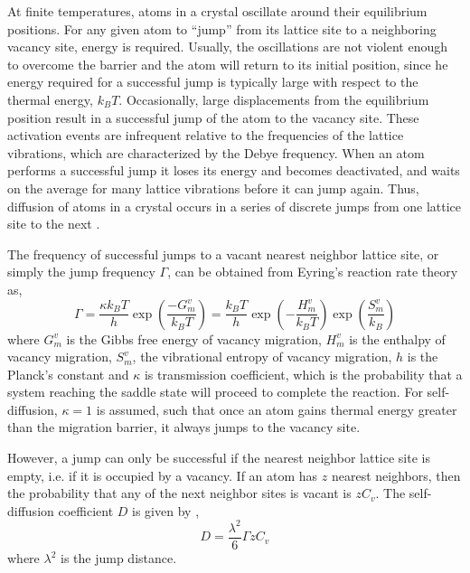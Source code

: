 \documentclass{article}
\begin{document}
At finite temperatures, atoms in a crystal oscillate around their equilibrium positions. For any given atom to \enquote{jump} from its lattice site to a neighboring vacancy site, energy is required. Usually, the oscillations are not violent enough to overcome the barrier and the atom will return to its initial position, since he energy required for a successful jump is typically large with respect to the thermal energy, $k_BT$.  Occasionally, large displacements from the equilibrium position result in a successful jump of the atom to the vacancy site. These activation events are infrequent relative to the frequencies of the lattice vibrations, which are characterized by the Debye frequency. When an atom performs a successful jump it loses its energy and becomes deactivated, and waits on the average for many lattice vibrations before it can jump again. Thus, diffusion of atoms in a crystal occurs in a series of discrete jumps from one lattice site to the next \cite{Mehrer2007}.

The frequency of successful jumps to a vacant nearest neighbor lattice site, or simply the jump frequency $\Gamma$, can be obtained from Eyring's reaction rate theory \cite{Eyring1935} as,
%
\begin{equation} \label{eq:2}
\Gamma = \dfrac{\kappa k_B T}{h} \exp\left(\dfrac{-G^v_m}{k_B T}\right) =\dfrac{k_B T}{h} \exp\left(-\dfrac{H^v_m}{k_B T}\right) \exp\left(\dfrac{S^v_m}{k_B}\right)
\end{equation}
%
where $G^v_m$ is the Gibbs free energy of vacancy migration, $H^v_m$ is the enthalpy of vacancy migration, $S^v_m$, the vibrational entropy of vacancy migration, $h$ is the Planck's constant and $\kappa$ is transmission coefficient, which is the probability that a system reaching the saddle state will proceed to complete the reaction. For self-diffusion, $\kappa=1$ is assumed, such that once an atom gains thermal energy greater than the migration barrier, it always jumps to the vacancy site.

However, a jump can only be successful if the nearest neighbor lattice site is empty, i.e. if it is occupied by a vacancy. If an atom has $z$ nearest neighbors, then the probability that any of the next neighbor sites is vacant is $z C_v$. The self-diffusion coefficient $D$ is given by \cite{Gottstein2004},
%
\begin{equation} \label{eq:3}
D = \dfrac{\lambda^2}{6} \Gamma z C_v 
\end{equation}
%
where $\lambda^2$ is the jump distance.
\end{document}
